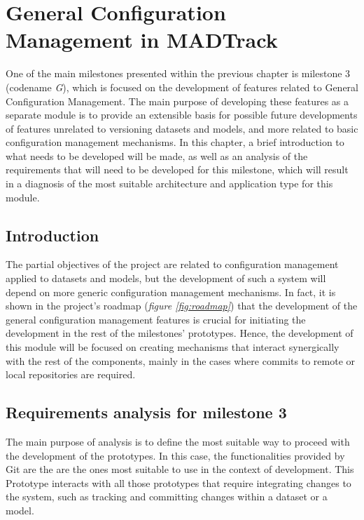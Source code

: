 \chapter{General Configuration Management in MADTrack}\label{cap:Milestone3}

One of the main milestones presented within the previous chapter is milestone 3 (codename \emph{G}), which is focused on the development of features related to General
Configuration Management. The main purpose of developing these features as a separate module is to provide an extensible basis for possible future developments of features
unrelated to versioning datasets and models, and more related to basic configuration management mechanisms. In this chapter, a brief introduction to what needs to be developed
will be made, as well as an analysis of the requirements that will need to be developed for this milestone, which will result in a diagnosis of the most suitable architecture
and application type for this module.

\section{Introduction}

The partial objectives of the project are related to configuration management applied to datasets and models, but the development of such a system will depend on more generic
configuration management mechanisms. In fact, it is shown in the project's roadmap (\emph{figure \ref{fig:roadmap}}) that the development of the general configuration management
features is crucial for initiating the development in the rest of the milestones' prototypes. Hence, the development of this module will be focused on creating mechanisms that interact
synergically with the rest of the components, mainly in the cases where commits to remote or local repositories are required.

\section{Requirements analysis for milestone 3}

The main purpose of analysis is to define the most suitable way to proceed with the development of the prototypes. In this case, the functionalities provided by Git are the 
are the ones most suitable to use in the context of development. This Prototype interacts with all those prototypes that require integrating changes to the system, such as 
tracking and committing changes within a dataset or a model.

